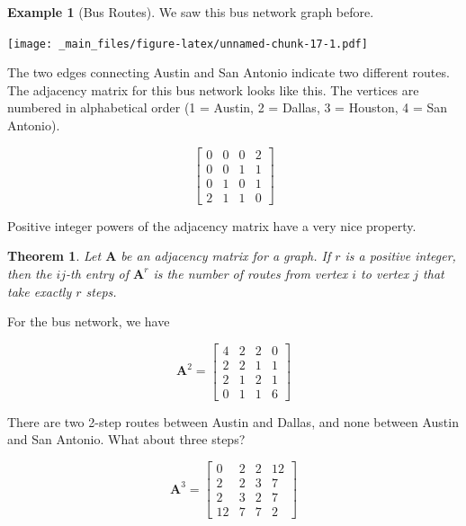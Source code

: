 \documentclass[
]{book}
\newtheorem{theorem}{Theorem}[chapter]
\theoremstyle{definition}
\theoremstyle{definition}
\newtheorem{example}{Example}[chapter]
\theoremstyle{definition}
\theoremstyle{definition}
\theoremstyle{remark}
\begin{document}
\begin{examplebox}

\begin{example}[Bus Routes]
We saw this bus network graph before.

\texttt{[image: \_main\_files/figure-latex/unnamed-chunk-17-1.pdf]}

The two edges connecting Austin and San Antonio indicate two different routes. The adjacency matrix for this bus network looks like this. The vertices are numbered in alphabetical order (1 = Austin, 2 = Dallas, 3 = Houston, 4 = San Antonio).

\[\begin{bmatrix}
0 & 0 & 0 & 2\\
0 & 0 & 1 & 1\\
0 & 1 & 0 & 1\\
2 & 1 & 1 & 0
\end{bmatrix}\]

Positive integer powers of the adjacency matrix have a very nice property.

\begin{theorembox}

\begin{theorem}
Let \(\mathbf{A}\) be an adjacency matrix for a graph. If \(r\) is a positive integer, then the \(ij\)-th entry of \(\mathbf{A}^r\) is the number of routes from vertex \(i\) to vertex \(j\) that take exactly \(r\) steps.
\end{theorem}

\end{theorembox}

For the bus network, we have

\[\mathbf{A}^2=\begin{bmatrix}
4 & 2 & 2 & 0\\
2 & 2 & 1 & 1\\
2 & 1 & 2 & 1\\
0 & 1 & 1 & 6
\end{bmatrix}\]

There are two 2-step routes between Austin and Dallas, and none between Austin and San Antonio. What about three steps?

\[ \mathbf{A}^3=\begin{bmatrix}
0 & 2 & 2 & 12\\
2 & 2 & 3 & 7\\
2 & 3 & 2 & 7\\
12 & 7 & 7 & 2
\end{bmatrix}\]
\end{example}

\end{examplebox}
\end{document}
